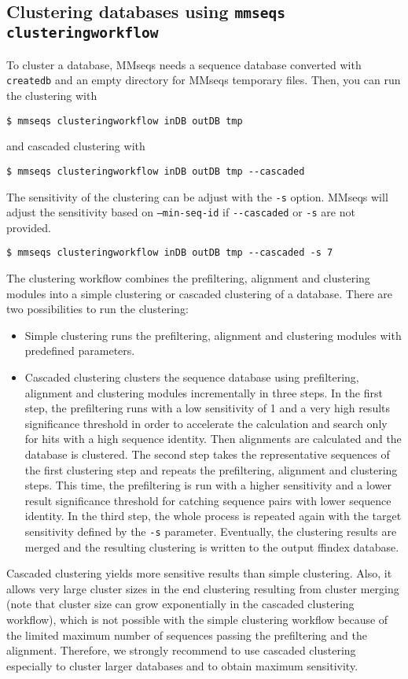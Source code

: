 \documentclass[11pt,a4paper]{report}
\begin{document}
\subsection{Clustering databases using \texttt{mmseqs clusteringworkflow}\label{sub:Clustering}}

To cluster a database, MMseqs needs a sequence database converted with \texttt{createdb}
and an empty directory for MMseqs temporary files. Then, you can run the clustering with

\texttt{\$ mmseqs clusteringworkflow inDB outDB tmp}

and cascaded clustering with

\texttt{\$ mmseqs clusteringworkflow inDB outDB tmp -{}-cascaded}

The sensitivity of the clustering can be adjust with the \texttt{-s}
option. MMseqs will adjust the sensitivity based on \texttt{--min-seq-id} if  \texttt{-{}-cascaded} or \texttt{-s}  are not provided. 

\texttt{\$ mmseqs clusteringworkflow inDB outDB tmp -{}-cascaded -s 7}

The clustering workflow combines the prefiltering, alignment and clustering
modules into a simple clustering or\emph{ }cascaded clustering of
a database. There are two possibilities to run the clustering:
\begin{itemize}
\item Simple clustering\emph{ }runs the prefiltering, alignment and clustering
modules with predefined parameters.
\item Cascaded clustering\emph{ }clusters the sequence database using prefiltering,
alignment and clustering modules incrementally in three steps. In
the first step, the prefiltering runs with a low sensitivity of 1
and a very high results significance threshold in order to accelerate
the calculation and search only for hits with a high sequence identity.
Then alignments are calculated and the database is clustered. The
second step takes the representative sequences of the first clustering
step and repeats the prefiltering, alignment and clustering steps.
This time, the prefiltering is run with a higher sensitivity and a
lower result significance threshold for catching sequence pairs with
lower sequence identity. In the third step, the whole process is repeated
again with the target sensitivity defined by the \texttt{-s} parameter.
Eventually, the clustering results are merged and the resulting clustering
is written to the output ffindex database. 
\end{itemize}
Cascaded clustering yields more sensitive results than simple clustering.
Also, it allows very large cluster sizes in the end clustering resulting
from cluster merging (note that cluster size can grow exponentially
in the cascaded clustering workflow), which is not possible with the
simple clustering workflow because of the limited maximum number of
sequences passing the prefiltering and the alignment. Therefore, we
strongly recommend to use cascaded clustering especially to cluster
larger databases and to obtain maximum sensitivity.
\end{document}
